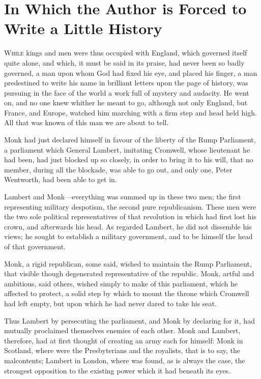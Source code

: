 \chapter{In Which the Author is Forced to Write a Little History}

\lettrine{W}{hile} kings and men were thus occupied with England, which governed itself quite alone, and which, it must be said in its praise, had never been so badly governed, a man upon whom God had fixed his eye, and placed his finger, a man predestined to write his name in brilliant letters upon the page of history, was pursuing in the face of the world a work full of mystery and audacity. He went on, and no one knew whither he meant to go, although not only England, but France, and Europe, watched him marching with a firm step and head held high. All that was known of this man we are about to tell.

Monk had just declared himself in favour of the liberty of the Rump Parliament, a parliament which General Lambert, imitating Cromwell, whose lieutenant he had been, had just blocked up so closely, in order to bring it to his will, that no member, during all the blockade, was able to go out, and only one, Peter Wentworth, had been able to get in.

Lambert and Monk—everything was summed up in these two men; the first representing military despotism, the second pure republicanism. These men were the two sole political representatives of that revolution in which  had first lost his crown, and afterwards his head. As regarded Lambert, he did not dissemble his views; he sought to establish a military government, and to be himself the head of that government.

Monk, a rigid republican, some said, wished to maintain the Rump Parliament, that visible though degenerated representative of the republic. Monk, artful and ambitious, said others, wished simply to make of this parliament, which he affected to protect, a solid step by which to mount the throne which Cromwell had left empty, but upon which he had never dared to take his seat.

Thus Lambert by persecuting the parliament, and Monk by declaring for it, had mutually proclaimed themselves enemies of each other. Monk and Lambert, therefore, had at first thought of creating an army each for himself: Monk in Scotland, where were the Presbyterians and the royalists, that is to say, the malcontents; Lambert in London, where was found, as is always the case, the strongest opposition to the existing power which it had beneath its eyes.

